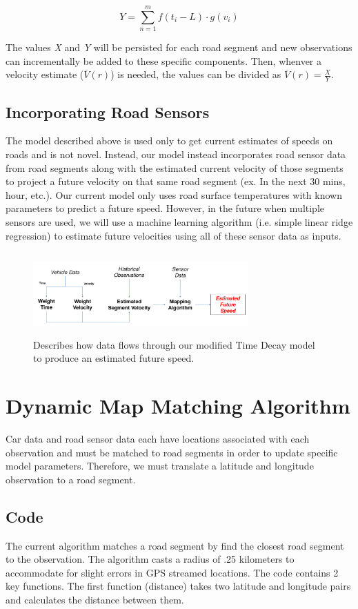 \documentclass{vldb}
\begin{document}
\begin{equation}Y = \sum_{n=1}^{m} f(t_i - L) \cdot g(v_i)\end{equation}

The values \textit{X} and \textit{Y} will be persisted for each road segment and new observations can incrementally be added to these specific components. Then, whenver a velocity estimate ($\overline{V}(r)$) is needed, the values can be divided as $\overline{V}(r)=\frac{X}{Y}$.


\subsection{Incorporating Road Sensors}
The model described above is used only to get current estimates of speeds on roads and is not novel. Instead, our model instead incorporates road sensor data from road segments along with the estimated current velocity of those segments to project a future velocity on that same road segment (ex. In the next 30 mins, hour, etc.). Our current model only uses road surface temperatures with known parameters to predict a future speed. However, in the future when multiple sensors are used, we will use a machine learning algorithm (i.e. simple linear ridge regression) to estimate future velocities using all of these sensor data as inputs. 

\begin{figure}
\centering
\includegraphics[width=3.25in,height=1.25in]{TimeDecay}
\caption{Describes how data flows through our modified Time Decay model to produce an estimated future speed.}
\label{fig:networkdiagram}
\end{figure}

\section {Dynamic Map Matching Algorithm}
Car data and road sensor data each have locations associated with each observation and must be matched to road segments in order to update specific model parameters. Therefore, we must translate a latitude and longitude observation to a road segment. 

\subsection{Code}
The current algorithm matches a road segment by find the closest road segment to the observation. The algorithm casts a radius of .25 kilometers to accommodate for slight errors in GPS streamed locations. The code contains 2 key functions. The first function (distance) takes two latitude and longitude pairs and calculates the distance between them. 
\end{document}
